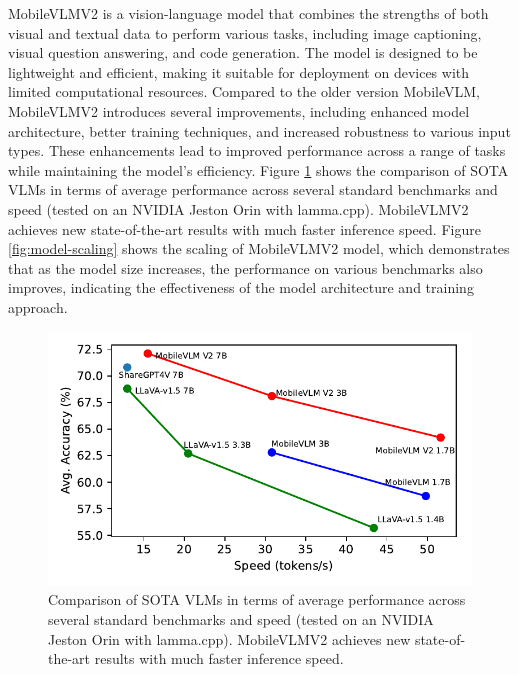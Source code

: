 \documentclass[conference]{IEEEtran}
\begin{document}
MobileVLMV2\cite{chu2024mobilevlm} is a vision-language model that combines the strengths of both visual and textual data to perform various tasks, including image captioning, visual question answering, and code generation. The model is designed to be lightweight and efficient, making it suitable for deployment on devices with limited computational resources.
Compared to the older version MobileVLM\cite{chu2023mobilevlm}, MobileVLMV2\cite{chu2024mobilevlm} introduces several improvements, including enhanced model architecture, better training techniques, and increased robustness to various input types. These enhancements lead to improved performance across a range of tasks while maintaining the model's efficiency.
Figure \ref{fig:latency-comparison-mobile} shows the comparison of SOTA VLMs in terms of average performance across several standard benchmarks and speed (tested on an NVIDIA Jeston Orin with lamma.cpp). MobileVLMV2 achieves new state-of-the-art results with much faster inference speed. Figure \ref{fig:model-scaling} shows the scaling of MobileVLMV2 model, which demonstrates that as the model size increases, the performance on various benchmarks also improves, indicating the effectiveness of the model architecture and training approach.
\begin{figure}[t]
  \centering
   \includegraphics[width=.87\columnwidth]{figures/mobilevlm_latency_mobile.pdf}
   \caption{Comparison of SOTA VLMs in terms of average performance across several standard benchmarks and speed (tested on an NVIDIA Jeston Orin with lamma.cpp). MobileVLMV2 achieves new state-of-the-art results with much faster inference speed.}
   \label{fig:latency-comparison-mobile}
\end{figure}
\end{document}
